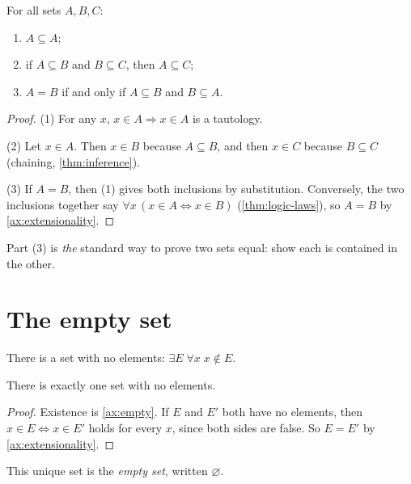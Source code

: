 \begin{theorem}
\label{thm:subset}
For all sets $A, B, C$:
\begin{enumerate}
  \item $A \subseteq A$;
  \item if $A \subseteq B$ and $B \subseteq C$, then $A \subseteq C$;
  \item $A = B$ if and only if $A \subseteq B$ and $B \subseteq A$.
\end{enumerate}
\end{theorem}

\begin{proof}
(1) For any $x$, $x \in A \Rightarrow x \in A$ is a tautology.

(2) Let $x \in A$. Then $x \in B$ because $A \subseteq B$, and then $x \in C$
because $B \subseteq C$ (chaining, \cref{thm:inference}).

(3) If $A = B$, then (1) gives both inclusions by substitution. Conversely, the
two inclusions together say $\forall x\, (x \in A \Leftrightarrow x \in B)$
(\cref{thm:logic-laws}), so $A = B$ by \cref{ax:extensionality}.
\end{proof}

Part (3) is \emph{the} standard way to prove two sets equal: show each is
contained in the other.

\section{The empty set}

\begin{axiom}
\label{ax:empty}
There is a set with no elements: $\exists E\; \forall x\; x \notin E$.
\end{axiom}

\begin{theorem}
\label{thm:empty-unique}
There is exactly one set with no elements.
\end{theorem}

\begin{proof}
Existence is \cref{ax:empty}. If $E$ and $E'$ both have no elements, then $x \in
E \Leftrightarrow x \in E'$ holds for every $x$, since both sides are false. So
$E = E'$ by \cref{ax:extensionality}.
\end{proof}

\begin{definition}
\label{def:emptyset}
This unique set is the \emph{empty set}, written $\varnothing$.
\end{definition}

